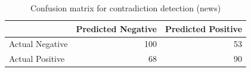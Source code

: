 \begin{table}
\caption{Confusion matrix for contradiction detection (news)}
\label{tab:confusion_matrix}
\begin{tabular}{lrr}
\toprule
 & Predicted Negative & Predicted Positive \\
\midrule
Actual Negative & 100 & 53 \\
Actual Positive & 68 & 90 \\
\bottomrule
\end{tabular}
\end{table}
